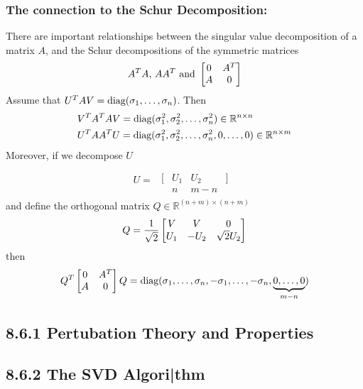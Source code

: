 \subsubsection*{The connection to the Schur Decomposition:} %

There are important relationships between the singular value decomposition of a matrix
$A$, and the Schur decompositions of the symmetric matrices 
\begin{equation}
	A^TA,\, AA^T \text{ and } \left[\begin{matrix} 0 & A^T \\ A & 0 \end{matrix}\right]
\end{equation}
Assume that $U^TAV=\text{diag}{(}\sigma_1,\dots,\sigma_n)$. Then
\begin{align}
	&V^TA^TAV = \text{diag}{(}\sigma_1^2,\sigma_2^2,\dots,\sigma_n^2)\in\mathbb R^{n\times n}
	\label{eq861}\\
	&U^TAA^TU = \text{diag}{(}\sigma_1^2,\sigma_2^2,\dots,\sigma_n^2,0,\dots,0)\in\mathbb R^{n\times m}
\end{align}
Moreover, if we decompose $U$
\begin{align}
	U= 
\begin{matrix}
	\\
	\begin{matrix}
	[ & U_1 & U_2 & ]\\
	  &	n & m-n &
	\end{matrix}
\end{matrix}
\end{align}
and define the orthogonal matrix $Q\in\mathbb R^{(n+m)\times(n+m)}$
\begin{align}
	Q=\frac1{\sqrt 2}\left[\begin{matrix} V & V & 0 \\ U_1 & -U_2 & \sqrt2U_2 \end{matrix}\right]
\end{align}
then
\begin{align}
	Q^T\left[\begin{matrix} 0 & A^T \\ A & 0  \end{matrix}\right] Q 
	= \text{diag}{(}\sigma_1,\dots,\sigma_n,-\sigma_1,\dots,-\sigma_n,\underbrace{0,\dots,0}_{m-n})
\end{align}


\subsection*{8.6.1 Pertubation Theory and Properties}

\subsection*{8.6.2 The SVD Algori|thm} %

